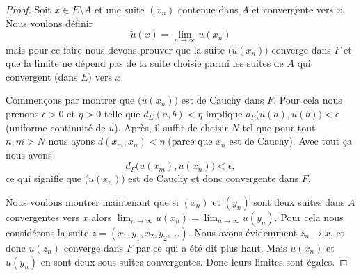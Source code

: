 \begin{proof}
	Soit \( x\in E\setminus A\) et une suite \( (x_n)\) contenue dans \( A\) et convergente vers \( x\). Nous voulons définir
	\begin{equation}
		\tilde u(x)=\lim_{n\to \infty} u(x_n)
	\end{equation}
	mais pour ce faire nous devons prouver que la suite \( \big( u(x_n) \big)\) converge dans \( F\) et que la limite ne dépend pas de la suite choisie parmi les suites de \( A\) qui convergent (dans \( E\)) vers \( x\).

	Commençons par montrer que \( \big( u(x_n) \big)\) est de Cauchy dans \( F\). Pour cela nous prenons \( \epsilon>0\) et \( \eta>0\) telle que \( d_E(a,b)<\eta\) implique \( d_F\big( u(a),u(b) \big)<\epsilon\) (uniforme continuité de \( u\)). Après, il suffit de choisir \( N\) tel que pour tout \( n,m>N\) nous ayons \( d(x_m,x_n)<\eta\) (parce que \( x_n\) est de Cauchy). Avec tout ça nous avons
	\begin{equation}
		d_F\big( u(x_m),u(x_n) \big)<\epsilon,
	\end{equation}
	ce qui signifie que \( \big( u(x_n) \big)\) est de Cauchy et donc convergente dans \( F\).

	Nous voulons montrer maintenant que si \( (x_n)\) et \( (y_n)\) sont deux suites dans \( A\) convergentes vers \( x\) alors \( \lim_{n\to \infty} u(x_n)=\lim_{n\to \infty} u(y_n)\). Pour cela nous considérons la suite \( z=(x_1,y_1,x_2,y_2,\ldots)\). Nous avons évidemment \( z_n\to x\), et donc \( u(z_n)\) converge dans \( F\) par ce qui a été dit plus haut. Mais \( u(x_n)\) et \( u(y_n)\) en sont deux sous-suites convergentes. Donc leurs limites sont égales.


\end{proof}
